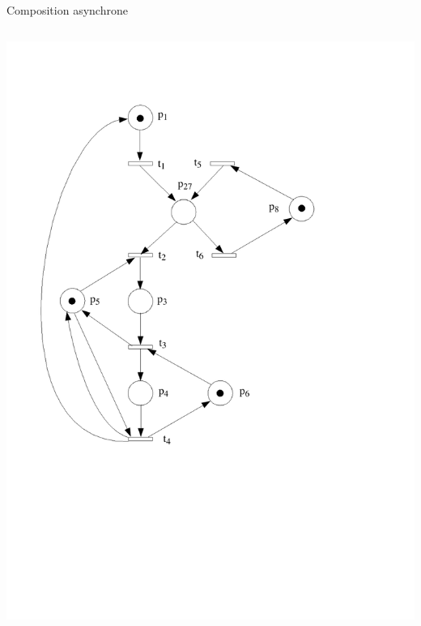 \documentclass[compress]{beamer}
\begin{document}
\begin{frame}{Composition asynchrone}
\begin{columns}
\begin{column}{.5\linewidth}
	\includegraphics[width=\linewidth]{exemplec}
\end{column}
\end{columns}
\end{frame}
\end{document}
